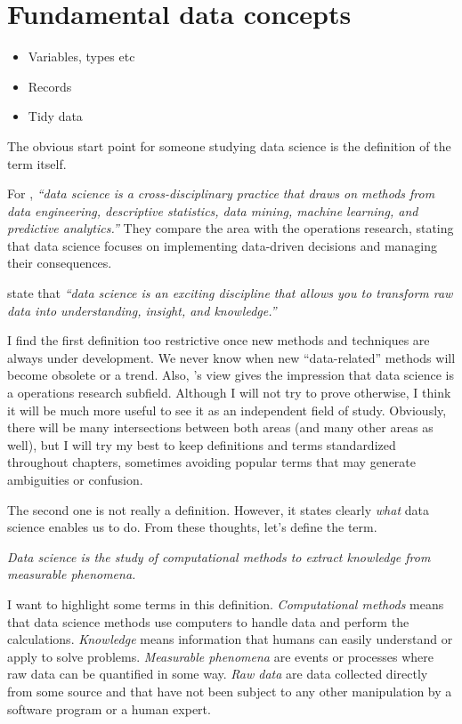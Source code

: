 \chapter{Fundamental data concepts}

\begin{itemize}
  \item Variables, types etc
  \item Records
  \item Tidy data
\end{itemize}

The obvious start point for someone studying data science is the definition of the term
itself.

For \textcite{Zumel2019}, \emph{``data science is a cross-disciplinary practice that draws
on methods from data engineering, descriptive statistics, data mining, machine learning,
and predictive analytics.''}  They compare the area with the operations research, stating
that data science focuses on implementing data-driven decisions and managing their
consequences.

\textcite{Hickham2023} state that \emph{``data science is an exciting discipline that
allows you to transform raw data into understanding, insight, and knowledge.''}

I find the first definition too restrictive once new methods and techniques are always
under development.  We never know when new ``data-related'' methods will become obsolete
or a trend.  Also, \textcite{Zumel2019}'s view gives the impression that data science is a
operations research subfield.  Although I will not try to prove otherwise, I think it will
be much more useful to see it as an independent field of study.  Obviously, there will be
many intersections between both areas (and many other areas as well), but I will try my best to keep definitions and
terms standardized throughout chapters, sometimes avoiding popular terms that may generate
ambiguities or confusion.

The second one is not really a definition.  However, it states clearly \emph{what} data
science enables us to do.  From these thoughts, let's define the term.

\begin{displayquote}
  \em
  Data science is the study of computational methods to extract knowledge from
  measurable phenomena.
\end{displayquote}

I want to highlight some terms in this definition.  \emph{Computational methods} means
that data science methods use computers to handle data and perform the calculations.
\emph{Knowledge} means information that humans can easily understand or apply to solve
problems.  \emph{Measurable phenomena} are events or processes where raw data can be
quantified in some way.  \emph{Raw data} are data collected directly from some source and
that have not been subject to any other manipulation by a software program or a human
expert.


